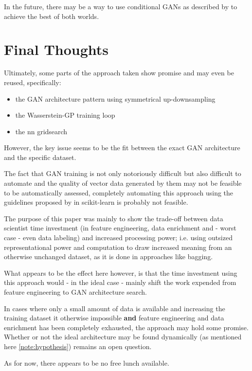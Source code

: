 In the future, there may be a way to use conditional \acp{GAN} as described by \cite{conditional_gans} to achieve the best of both worlds.

\pagebreak

\section{Final Thoughts}

Ultimately, some parts of the approach taken show promise and may even be reused, specifically:

\begin{itemize}
	\item the \ac{GAN} architecture pattern using symmetrical up-downsampling
	\item the Wasserstein-GP training loop
	\item the \ac{nn} gridsearch
\end{itemize}

However, the key issue seems to be the fit between the exact \ac{GAN} architecture and the specific dataset.

The fact that \ac{GAN} training is not only notoriously difficult but also difficult to automate and the quality of vector data generated by them may not be feasible to be automatically assessed, completely automating this approach using the guidelines proposed by \cite{buitinck2013api} in scikit-learn is probably not feasible.

The purpose of this paper was mainly to show the trade-off between data scientist time investment (in feature engineering, data enrichment and - worst case - even data labeling) and increased processing power; i.e. using outsized representational power and computation to draw increased meaning from an otherwise unchanged dataset, as it is done in approaches like \ac{bagging}.

What appears to be the effect here however, is that the time investment using this approach would - in the ideal case - mainly shift the work expended from feature engineering to \ac{GAN} architecture search.

In cases where only a small amount of data is available and increasing the training dataset it otherwise impossible \textbf{and} feature engineering and data enrichment has been completely exhausted, the approach may hold some promise. Whether or not the ideal architecture may be found dynamically (as mentioned here \ref{note:hypothesis}) remains an open question.

As for now, there appears to be no free lunch available.

\pagebreak
